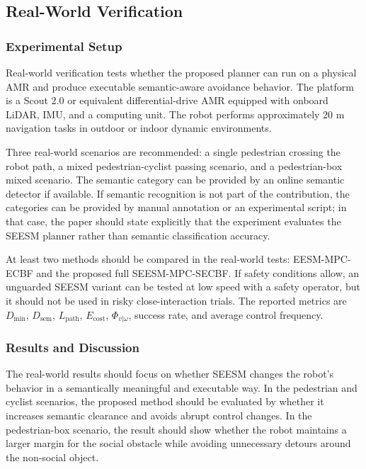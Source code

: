 \documentclass[journal]{IEEEtranTIE}
\begin{document}
    \subsection{Real-World Verification}
    \label{E_real_world-section}
    \subsubsection{Experimental Setup}
    Real-world verification tests whether the proposed planner can run on a
    physical AMR and produce executable semantic-aware avoidance behavior. The
    platform is a Scout 2.0 or equivalent differential-drive AMR equipped with
    onboard LiDAR, IMU, and a computing unit. The robot performs approximately
    20 m navigation tasks in outdoor or indoor dynamic environments.

    Three real-world scenarios are recommended: a single pedestrian crossing the
    robot path, a mixed pedestrian-cyclist passing scenario, and a pedestrian-box
    mixed scenario. The semantic category can be provided by an online semantic
    detector if available. If semantic recognition is not part of the contribution,
    the categories can be provided by manual annotation or an experimental script;
    in that case, the paper should state explicitly that the experiment evaluates
    the SEESM planner rather than semantic classification accuracy.

    At least two methods should be compared in the real-world tests:
    EESM-MPC-ECBF and the proposed full SEESM-MPC-SECBF. If safety conditions
    allow, an unguarded SEESM variant can be tested at low speed with a safety
    operator, but it should not be used in risky close-interaction trials. The
    reported metrics are $D_{\min}$, $D_{\mathrm{sem}}$, $L_{\mathrm{path}}$,
    $E_{\mathrm{cost}}$, $\Phi_{v|\omega}$, success rate, and average control
    frequency.

    \subsubsection{Results and Discussion}
    The real-world results should focus on whether SEESM changes the robot's
    behavior in a semantically meaningful and executable way. In the pedestrian
    and cyclist scenarios, the proposed method should be evaluated by whether it
    increases semantic clearance and avoids abrupt control changes. In the
    pedestrian-box scenario, the result should show whether the robot maintains a
    larger margin for the social obstacle while avoiding unnecessary detours
    around the non-social object.
\end{document}
